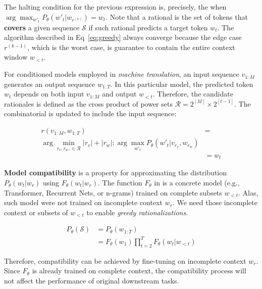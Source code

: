 The halting condition for the previous expression is, precisely, the  when $ \arg \max_{w'_t} P_{\theta}(w'_t|w_{r^{(k)}}) = w_t$.  Note that a rational is the set of tokens that \textbf{covers} a given sequence $\mathcal{S}$ if such rational predicts a target token $w_t$. The algorithm described in Eq~\ref{eq:greedy} always converge because the edge case $r^{(k-1)}$, which is the worst case, is guarantee to contain the entire context window $w_{<t}$. 

For conditioned models employed in \textit{machine translation}, an input sequence $v_{1:M}$ generates an output sequence $w_{1:T}$. In this particular model, the predicted token $w_t$ depends on both input $v_{1:M}$ and output $w_{<t}$. Therefore, the candidate rationales is defined as the cross product of power sets $\mathcal{R} = 2^{[M]}\times 2^{[t-1]}$. The combinatorial  is updated to include the input sequence:

\begin{equation}
\begin{split}
r(v_{1:M},w_{1:T})  & = \\
\arg \min_{r_v,r_w, \in \mathcal{R}} |r_v| + |r_w| : \arg \max_{w'_t} P_{\theta}(w'_t|v_{r_v},w_{r_w}) \\
                    & = w_t
\end{split}
\label{eq:combinatorialMT}
\end{equation}

\textbf{Model compatibility} is a property for approximating the distribution $P_{\theta}(w_t|w_r)$ using $F_{\theta}(w_t|w_r)$. The function $F_{\theta}$ in  is a concrete model (e.g., Transformer, Recurrent Nets, or n-grams) trained on complete subsets $w_{<t}$. Alas, such model were not trained on incomplete context $w_r$. We need those incomplete context or subsets of $w_{<t}$ to enable \textit{greedy rationalizations}.

\begin{equation}
\begin{split}
P_{\theta}(\mathcal{S}) & = P_{\theta}(w_{1:T}) \\
                        & = F_{\theta}(w_1)\prod_{t = 2}^{T} F_{\theta}(w_t | w_{<t} )
\end{split}
\label{eq:llm2}
\end{equation}

Therefore, compatibility can be achieved by fine-tuning on incomplete context $w_r$. Since $F_{\theta}$ is already trained on complete context, the compatibility process will not affect the performance of original downstream tasks. 

